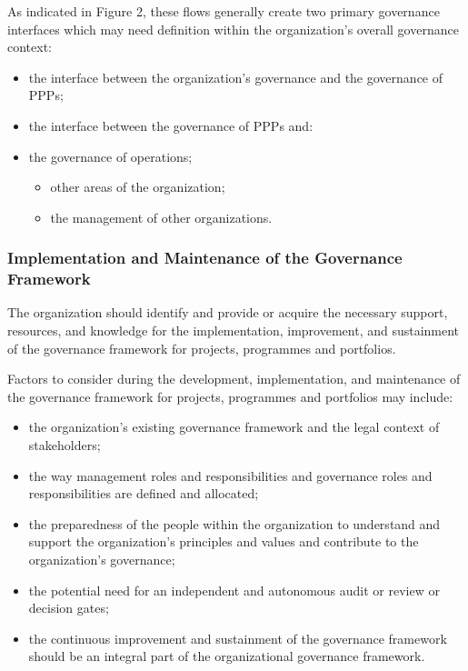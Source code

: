 \documentclass[letterpaper,10pt,english]{jupyterBook}
\begin{document}
\sphinxAtStartPar
As indicated in Figure 2, these flows generally create two primary governance interfaces which may need definition within the organization’s overall governance context:
\begin{itemize}
\item {} 
\sphinxAtStartPar
the interface between the organization’s governance and the governance of PPPs;

\item {} 
\sphinxAtStartPar
the interface between the governance of PPPs and:

\item {} 
\sphinxAtStartPar
the governance of operations;
\begin{itemize}
\item {} 
\sphinxAtStartPar
other areas of the organization;

\item {} 
\sphinxAtStartPar
the management of other organizations.

\end{itemize}

\end{itemize}


\subsubsection{Implementation and Maintenance of the Governance Framework}
\label{\detokenize{PM/ppm:implementation-and-maintenance-of-the-governance-framework}}
\sphinxAtStartPar
The organization should identify and provide or acquire the necessary support, resources, and knowledge for the implementation, improvement, and sustainment of the governance framework for projects, programmes and portfolios.

\sphinxAtStartPar
Factors to consider during the development, implementation, and maintenance of the governance framework for projects, programmes and portfolios may include:
\begin{itemize}
\item {} 
\sphinxAtStartPar
the organization’s existing governance framework and the legal context of stakeholders;

\item {} 
\sphinxAtStartPar
the way management roles and responsibilities and governance roles and responsibilities are defined and allocated;

\item {} 
\sphinxAtStartPar
the preparedness of the people within the organization to understand and support the organization’s principles and values and contribute to the organization’s governance;

\item {} 
\sphinxAtStartPar
the potential need for an independent and autonomous audit or review or decision gates;

\item {} 
\sphinxAtStartPar
the continuous improvement and sustainment of the governance framework should be an integral part of the organizational governance framework.

\end{itemize}
\end{document}
